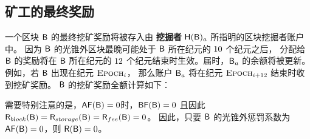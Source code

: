 \subsection{矿工的最终奖励}

一个区块 $\textsf{B}$  的最终挖矿奖励将被存入由 {\bf 挖掘者} $\textsf{H}(\textsf{B})_a$ 所指明的区块挖掘者账户中。
因为 $\textsf{B}$ 的光锥外区块最晚可能处于 $\textsf{B}$ 所在纪元的 ${10}$ 个纪元之后，
分配给 $\textsf{B}$ 的奖励将在 $\textsf{B}$ 所在纪元的 $12$ 个纪元结束时生效。届时，$\textsf{B}_a$ 的余额将被更新。
例如，若 $\textsf{B}$ 出现在纪元 $\textsc{Epoch}_i$， 那么账户 $\textsf{B}_a$ 将在纪元 $\textsc{Epoch}_{i+12}$ 结束时收到挖矿奖励。
$\textsf{B}$ 的挖矿奖励全额计算如下：

\newversion{
	\begin{align}
	\reward(\block)\eqdef  \award(\block) + \storageaward(\block) + \feeaward(\block) 
\end{align}
}

需要特别注意的是，$\mathsf{AF}(\textsf{B})=0$时，$\mathsf{BF}(\textsf{B})=0$ 且因此 $\textsf{R}_{block}(\textsf{B})=\textsf{R}_{storage}(\textsf{B})=\textsf{R}_{fee}(\textsf{B})=0$。
因此，只要 $\textsf{B}$ 的光锥外惩罚系数为 $\mathsf{AF}(\textsf{B})=0$，则 $\textsf{R}(\textsf{B})=0$。







